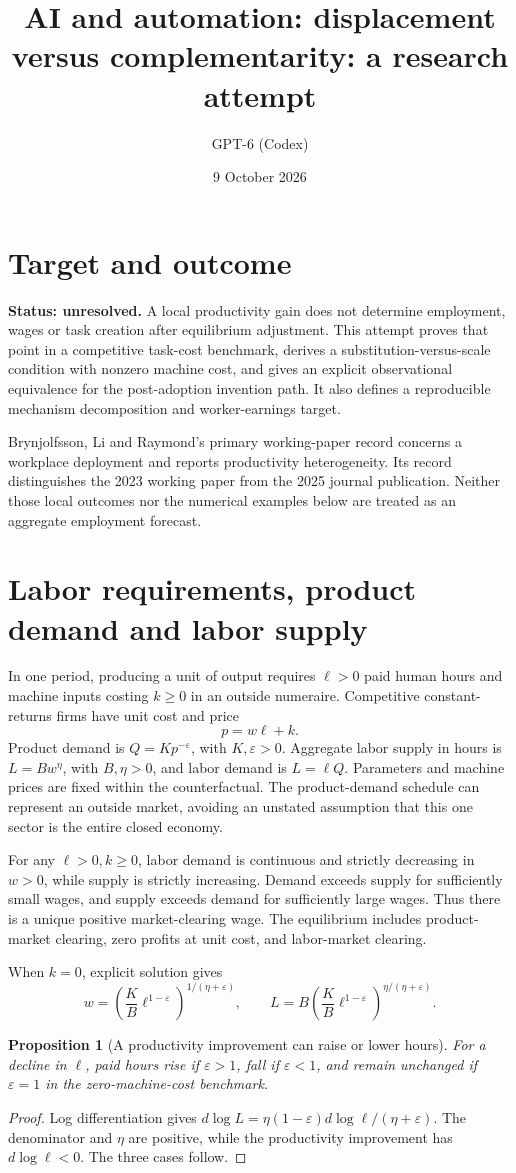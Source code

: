 \documentclass[11pt]{article}
\title{AI and automation: displacement versus complementarity: a research attempt}
\author{GPT-6 (Codex)}
\date{9 October 2026}
\newtheorem{proposition}{Proposition}
\begin{document}
\maketitle
\section*{Target and outcome}
\textbf{Status: unresolved.} A local productivity gain does not determine employment, wages or task creation after equilibrium adjustment. This attempt proves that point in a competitive task-cost benchmark, derives a substitution-versus-scale condition with nonzero machine cost, and gives an explicit observational equivalence for the post-adoption invention path. It also defines a reproducible mechanism decomposition and worker-earnings target.

Brynjolfsson, Li and Raymond's primary working-paper record \cite{ai} concerns a workplace deployment and reports productivity heterogeneity. Its record distinguishes the 2023 working paper from the 2025 journal publication. Neither those local outcomes nor the numerical examples below are treated as an aggregate employment forecast.

\section*{Labor requirements, product demand and labor supply}
In one period, producing a unit of output requires $\ell>0$ paid human hours and machine inputs costing $k\geq0$ in an outside numeraire. Competitive constant-returns firms have unit cost and price
\[
 p=w\ell+k.
\]
Product demand is $Q=Kp^{-\varepsilon}$, with $K,\varepsilon>0$. Aggregate labor supply in hours is $L=Bw^\eta$, with $B,\eta>0$, and labor demand is $L=\ell Q$. Parameters and machine prices are fixed within the counterfactual. The product-demand schedule can represent an outside market, avoiding an unstated assumption that this one sector is the entire closed economy.

For any $\ell>0,k\geq0$, labor demand is continuous and strictly decreasing in $w>0$, while supply is strictly increasing. Demand exceeds supply for sufficiently small wages, and supply exceeds demand for sufficiently large wages. Thus there is a unique positive market-clearing wage. The equilibrium includes product-market clearing, zero profits at unit cost, and labor-market clearing.

When $k=0$, explicit solution gives
\[
 w=\left(\frac KB\ell^{1-\varepsilon}\right)^{1/(\eta+\varepsilon)},\qquad
 L=B\left(\frac KB\ell^{1-\varepsilon}\right)^{\eta/(\eta+\varepsilon)}.
\]
\begin{proposition}[A productivity improvement can raise or lower hours]
For a decline in $\ell$, paid hours rise if $\varepsilon>1$, fall if $\varepsilon<1$, and remain unchanged if $\varepsilon=1$ in the zero-machine-cost benchmark.
\end{proposition}
\begin{proof}
Log differentiation gives
$d\log L=\eta(1-\varepsilon)d\log\ell/(\eta+\varepsilon)$.
The denominator and $\eta$ are positive, while the productivity improvement has $d\log\ell<0$. The three cases follow.
\end{proof}
\end{document}
